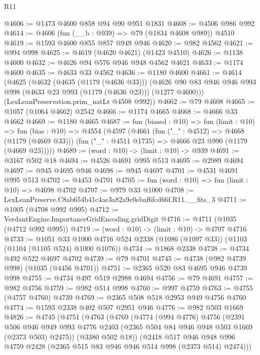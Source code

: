 \begin{lexlean}{R11}
\begin{coremodule}
@4606 := @1473 @4600 @858 @94 @90 @951 @1831
@4608 := @4506 @986 @992
@4614 := @4606 (fun (__b : @939) => @79 (@1834 @4608 @989)) @4510
@4619 := @1593 @4600 @855 @857 @949 @946
@4620 := @982 @4562
@4621 := @994 @998
@4625 := @4619 (@4620 @4621) (@1423 @4510)
@4626 := @1138 @4600
@4632 := @4626 @94 @576 @946 @948 @4562 @4621
@4633 := @1174 @4600
@4635 := @4633 @33 @4562
@4636 := @1180 @4600
@4661 := @4614
    (@4625
      (@4632
        (@4635 (@1179 (@4636 @33)))
        (@4626 @90 @83 @946 @946 @993 @998 (@4633 @23 @993 (@1179 (@4636 @23))) (@1277 @4600)))
      (LexLeanPreservation.prim_natLt @4508 @992))
@4662 := @79 @4608
@4665 := @1057 (@1064 @4662) @2542
@4666 := @1174 @4665
@4668 := @4666 @33 @4662
@4669 := @1180 @4665
@4687 := fun (biased : @10) =>
  fun (limit : @10) =>
  fun (bias : @10) =>
  @4554
    (@4597
      (@4661
        (fun ("_" : @4512) => @4668 (@1179 (@4669 @33)))
        (fun ("_" : @4511 @1735) => @4666 @23 @990 (@1179 (@4669 @23)))))
@4689 := (word : @10) -> (limit : @10) -> @939
@4691 := @3167 @502 @18
@4694 := @4526 @4691 @995 @513
@4695 := @2989 @4694
@4697 := @945 @4695 @946
@4698 := @945 @4697
@4701 := @4531 @4691 @995 @513
@4702 := @4453 @4701
@4705 := fun (word : @10) => fun (limit : @10) => @4698 @4702
@4707 := @979 @33 @1000
@4708 := LexLeanPreserve.C8ab654b41c4ae3a82a9c0ebaf6fcd66f.R11.__fits_3
@4711 := @1005 (@4708 @992 @995)
@4712 := VerdantEngine.ImportanceGridEncoding.gridDigit
@4716 := @4711 (@1035 (@4712 @992 @995))
@4719 := (word : @10) -> (limit : @10) -> @4707 @4716
@4733 := @1051
    @33
    @1000
    @4716
    @524
    @2338
    (@1086 (@1097 @33))
    (@1103 (@1104 (@1105 @524) @1000 @1076))
@4734 := @1868 @2338
@4738 := @4734 @492 @522 @4697 @4702
@4739 := @79 @4701
@4745 := @4738 (@982 @4739 @998) (@1035 (@4456 @4701))
@4751 := @2365 @520 @83 @4695 @946 @4739 @998
@4755 := @4734 @497 @519 @2988 @4694
@4756 := @79 @4691
@4757 := @982 @4756
@4759 := @982 @514 @998
@4760 := @997 @4759
@4763 := @4755 (@4757 @4760) @4739
@4769 := @2365 @508 @518 @2953 @949 @4756 @4760
@4774 := @1593 @2338 @402 @507 @2951 @946
@4776 := @982 @503 @1669
@4826 := @4745
    (@4751
      (@4763
        (@4769
          (@4774
            (@994 @4776)
            @4756
            (@2391
              @506
              @946
              @949
              @993
              @4776
              @2403
              (@2365 @504 @84 @946 @948 @503 @1669 (@2373 @503) @2475))
            (@3380 @502 @18))
          (@2418
            @517
            @946
            @948
            @996
            @4759
            @2428
            (@2365 @515 @83 @946 @946 @514 @998 (@2373 @514) @2474)))

\end{coremodule}
\end{lexlean}
